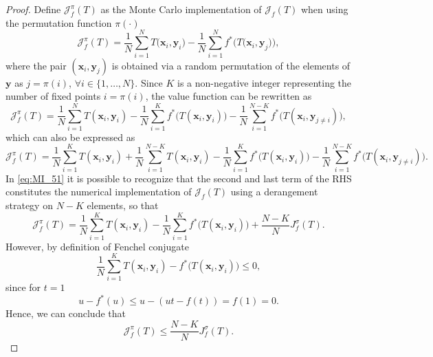 \begin{proof}
Define $\mathcal{J}_{f}^{\pi}(T)$ as the Monte Carlo implementation of $\mathcal{J}_{f}(T)$ when using the permutation function $\pi(\cdot)$
\begin{equation}
    \mathcal{J}_{f}^{\pi}(T) = \frac{1}{N}\sum_{i=1}^{N}{T(\mathbf{x}_i,\mathbf{y}_i}) -  \frac{1}{N}\sum_{i=1}^{N}{f^{*}\bigl(T(\mathbf{x}_i,\mathbf{y}_j})\bigr),
\end{equation}
where the pair $(\mathbf{x}_i,\mathbf{y}_j)$ is obtained via a random permutation of the elements of $\mathbf{y}$ as $j=\pi(i)$, $\forall i \in \{1,\dots,N\}$.
Since $K$ is a non-negative integer representing the number of fixed points $i=\pi(i)$, the value function can be rewritten as
\begin{equation}
    \label{eq:MI_monte-carlo-1}
    \mathcal{J}_{f}^{\pi}(T) = \frac{1}{N}\sum_{i=1}^{N}{T(\mathbf{x}_i,\mathbf{y}_i)} -  \frac{1}{N}\sum_{i=1}^{K}{f^{*}\bigl(T(\mathbf{x}_i,\mathbf{y}_i)\bigr)} -
    \frac{1}{N}\sum_{i=1}^{N-K}{f^{*}\bigl(T(\mathbf{x}_i,\mathbf{y}_{j\neq i})\bigr)},
\end{equation}
which can also be expressed as
\begin{equation}
\label{eq:MI_51}
    \mathcal{J}_{f}^{\pi}(T) = \frac{1}{N}\sum_{i=1}^{K}{T(\mathbf{x}_i,\mathbf{y}_i)} + \frac{1}{N}\sum_{i=1}^{N-K}{T(\mathbf{x}_i,\mathbf{y}_i)} -  \frac{1}{N}\sum_{i=1}^{K}{f^{*}\bigl(T(\mathbf{x}_i,\mathbf{y}_i)\bigr)} -
    \frac{1}{N}\sum_{i=1}^{N-K}{f^{*}\bigl(T(\mathbf{x}_i,\mathbf{y}_{j\neq i})\bigr)}.
\end{equation}
In \eqref{eq:MI_51} it is possible to recognize that the second and last term of the RHS constitutes the numerical implementation of $\mathcal{J}_{f}(T)$ using a derangement strategy on $N-K$ elements, so that
\begin{equation}
    \mathcal{J}_{f}^{\pi}(T) = \frac{1}{N}\sum_{i=1}^{K}{T(\mathbf{x}_i,\mathbf{y}_i)} -\frac{1}{N}\sum_{i=1}^{K}{f^{*}\bigl(T(\mathbf{x}_i,\mathbf{y}_i)\bigr)} + \frac{N-K}{N} {J}_{f}^{\sigma}(T).
\end{equation}
However, by definition of Fenchel conjugate
\begin{equation}
    \frac{1}{N}\sum_{i=1}^{K}{T(\mathbf{x}_i,\mathbf{y}_i)-f^{*}\bigl(T(\mathbf{x}_i,\mathbf{y}_i)\bigr)} \leq 0,
\end{equation}
since for $t=1$
\begin{equation}
    u-f^*(u) \leq u - (ut -f(t)) = f(1) = 0.
\end{equation}
Hence, we can conclude that
\begin{equation}
    \mathcal{J}_{f}^{\pi}(T) \leq \frac{N-K}{N} {J}_{f}^{\sigma}(T).
\end{equation}
\end{proof}


